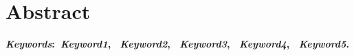 \chapter*{Abstract}
\noindent \lipsum[1]

\vspace{5mm}
\noindent\textbf{\textit{Keywords}:~\textit{Keyword1}, ~\textit{Keyword2}, ~\textit{Keyword3}, ~\textit{Keyword4}, ~\textit{Keyword5}.}
